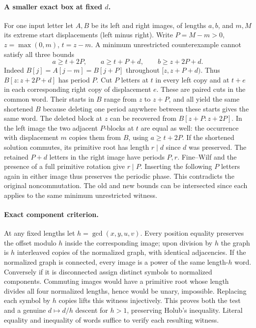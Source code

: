 \paragraph{A smaller exact box at fixed $d$.}
For one input letter let $A,B$ be its left and right images, of lengths
$a,b$, and $m,M$ its extreme start displacements (left minus right).
Write $P=M-m>0$, $z=\max(0,m)$, $t=z-m$.
A minimum unrestricted counterexample cannot satisfy all three bounds
\[
 a\ge t+2P,\qquad a\ge t+P+d,\qquad b\ge z+2P+d.
\]
Indeed $B[j]=A[j-m]=B[j+P]$ throughout $[z,z+P+d)$.
Thus $B[z:z+2P+d]$ has period $P$. Cut $P$ letters at $t$ in
every left copy and at $t+e$ in each corresponding right copy of
displacement $e$. These are paired cuts in the common word. Their
starts in $B$ range from $z$ to $z+P$, and all yield the same shortened
$B$ because deleting one period anywhere between these starts gives
the same word. The deleted block at $z$ can be recovered from
$B[z+P:z+2P]$. In the left image the two adjacent $P$-blocks at $t$
are equal as well: the occurrence with displacement $m$ copies them
from $B$, using $a\ge t+2P$. If the shortened solution commutes,
its primitive root has length $r\mid d$ since $d$ was preserved.
The retained $P+d$ letters in the right image have periods $P,r$.
Fine--Wilf and the presence of a full primitive rotation give $r\mid P$.
Inserting the following $P$ letters again in either image thus preserves
the periodic phase. This contradicts the original noncommutation.
The old and new bounds can be intersected since each applies to the
same minimum unrestricted witness.

\paragraph{Exact component criterion.}
At any fixed lengths let $h=\gcd(x,y,u,v)$. Every position equality
preserves the offset modulo $h$ inside the corresponding image; upon
division by $h$ the graph is $h$ interleaved copies of the normalized
graph, with identical adjacencies. If the normalized graph is connected,
every image is a power of the same length-$h$ word. Conversely if it
is disconnected assign distinct symbols to normalized components.
Commuting images would have a primitive root whose length divides all
four normalized lengths, hence would be unary, impossible. Replacing
each symbol by $h$ copies lifts this witness injectively. This proves
both the test and a genuine $d\mapsto d/h$ descent for $h>1$, preserving
Holub's inequality. Literal equality and inequality of words suffice to
verify each resulting witness.

